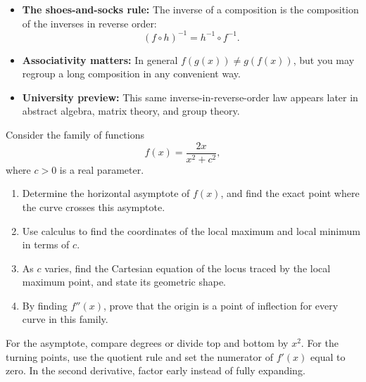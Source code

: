 \begin{takeaways}
\begin{itemize}[leftmargin=*]
\item \textbf{The shoes-and-socks rule:} The inverse of a composition is the composition of the inverses in reverse order:
\[
(f\circ h)^{-1}=h^{-1}\circ f^{-1}.
\]
\item \textbf{Associativity matters:} In general $f(g(x))\ne g(f(x))$, but you may regroup a long composition in any convenient way.
\item \textbf{University preview:} This same inverse-in-reverse-order law appears later in abstract algebra, matrix theory, and group theory.
\end{itemize}
\end{takeaways}

\begin{problem}
Consider the family of functions
\[
f(x)=\frac{2x}{x^2+c^2},
\]
where $c>0$ is a real parameter.

\begin{enumerate}[label=(\alph*)]
\item Determine the horizontal asymptote of $f(x)$, and find the exact point where the curve crosses this asymptote.
\item Use calculus to find the coordinates of the local maximum and local minimum in terms of $c$.
\item As $c$ varies, find the Cartesian equation of the locus traced by the local maximum point, and state its geometric shape.
\item By finding $f''(x)$, prove that the origin is a point of inflection for every curve in this family.
\end{enumerate}
\end{problem}

\begin{hint}
For the asymptote, compare degrees or divide top and bottom by $x^2$. For the turning points, use the quotient rule and set the numerator of $f'(x)$ equal to zero. In the second derivative, factor early instead of fully expanding.
\end{hint}


